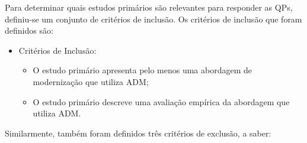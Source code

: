 
Para determinar quais estudos primários são relevantes para responder as QPs, definiu-se um conjunto de critérios de inclusão. Os critérios de inclusão que foram definidos são:

\begin{itemize}
\item Critérios de Inclusão:
    \begin{itemize}
    \item O estudo primário apresenta pelo menos uma abordagem de modernização que utiliza ADM;
    \item O estudo primário descreve uma avaliação empírica da abordagem que utiliza ADM.
    \end{itemize}
\end{itemize}

Similarmente, também foram definidos três critérios de exclusão, a saber:

